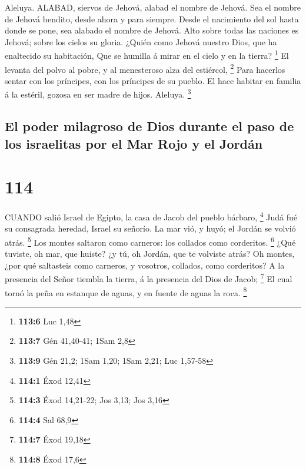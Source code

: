  Aleluya. ALABAD, siervos de Jehová, alabad el nombre de
Jehová.  Sea el nombre de Jehová bendito, desde ahora y para
siempre.  Desde el nacimiento del sol hasta donde se pone,
sea alabado el nombre de Jehová.  Alto sobre todas las
naciones es Jehová; sobre los cielos su gloria.  ¿Quién como
Jehová nuestro Dios, que ha enaltecido su habitación,  Que
se humilla á mirar en el cielo y en la tierra? \footnote{\textbf{113:6}
  Luc 1,48}  El levanta del polvo al pobre, y al menesteroso
alza del estiércol, \footnote{\textbf{113:7} Gén 41,40-41; 1Sam 2,8}
 Para hacerlos sentar con los príncipes, con los príncipes
de su pueblo.  El hace habitar en familia á la estéril,
gozosa en ser madre de hijos. Aleluya. \footnote{\textbf{113:9} Gén
  21,2; 1Sam 1,20; 1Sam 2,21; Luc 1,57-58}

\hypertarget{el-poder-milagroso-de-dios-durante-el-paso-de-los-israelitas-por-el-mar-rojo-y-el-jorduxe1n}{%
\subsection{El poder milagroso de Dios durante el paso de los israelitas
por el Mar Rojo y el
Jordán}\label{el-poder-milagroso-de-dios-durante-el-paso-de-los-israelitas-por-el-mar-rojo-y-el-jorduxe1n}}

\hypertarget{section-113}{%
\section{114}\label{section-113}}

 CUANDO salió Israel de Egipto, la casa de Jacob del pueblo
bárbaro, \footnote{\textbf{114:1} Éxod 12,41}  Judá fué su
consagrada heredad, Israel su señorío.  La mar vió, y huyó;
el Jordán se volvió atrás. \footnote{\textbf{114:3} Éxod 14,21-22; Jos
  3,13; Jos 3,16}  Los montes saltaron como carneros: los
collados como corderitos. \footnote{\textbf{114:4} Sal 68,9}
 ¿Qué tuviste, oh mar, que huiste? ¿y tú, oh Jordán, que te
volviste atrás?  Oh montes, ¿por qué saltasteis como
carneros, y vosotros, collados, como corderitos?  A la
presencia del Señor tiembla la tierra, á la presencia del Dios de Jacob;
\footnote{\textbf{114:7} Éxod 19,18}  El cual tornó la peña
en estanque de aguas, y en fuente de aguas la roca. \footnote{\textbf{114:8}
  Éxod 17,6}

